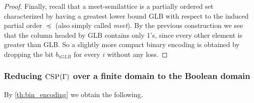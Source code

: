 \documentclass[11pt]{article}
\newcommand{\CSP}{\textsc{CSP}}
\newcommand{\Max}{\textsf{Max}}
\newcommand{\Min}{\textsf{Min}}
\newcommand{\1}{\textbf{1}}
\newcommand\uval{{(|D|-1)}}
\newtheorem{corollary}[theorem]{Corollary}
\begin{document}
\begin{proof}
    Finally, recall that a meet-semilattice is a partially ordered set characterized by having a greatest lower bound GLB with respect to the induced partial order $\preceq$ (also simply called \textit{meet}). By the previous construction we see that the column headed by GLB contains only 1's, since every other element is greater than GLB. So a slightly more compact binary encoding is obtained by dropping the bit $b_{iGLB}$ for every $i$ without any loss.
\end{proof}


 
\subsubsection[Reducing CSP(Gamma) over a finite domain to the Boolean domain]{Reducing $\CSP(\Gamma)$ over a finite domain to the Boolean domain}\label{sect:mapping2bool}
By \cref{th:bin_encoding} we obtain the following.%
\end{document}
